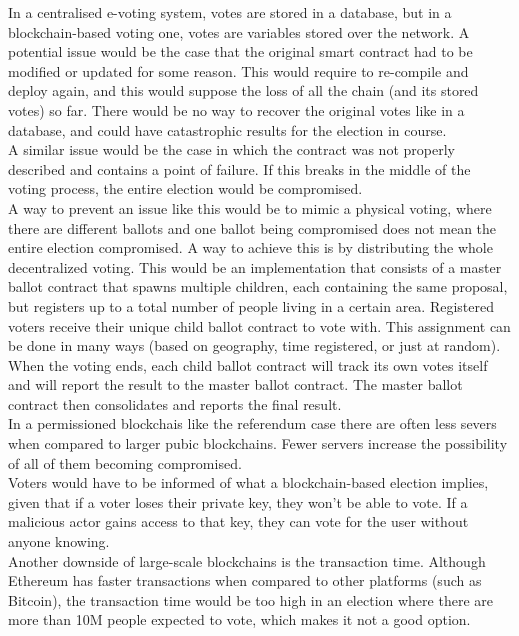 \documentclass[10pt]{article}
\begin{document}
\begin{multicols}{2}
In a centralised e-voting system, votes are stored in a database, but in a blockchain-based voting one, votes are variables stored over the network. A potential issue would be the case that the original smart contract had to be modified or updated for some reason. This would require to re-compile and deploy again, and this would suppose the loss of all the chain (and its stored votes) so far. There would be no way to recover the original votes like in a database, and could have catastrophic results for the election in course.\\

A similar issue would be the case in which the contract was not properly described and contains a point of failure. If this breaks in the middle of the voting process, the entire election would be compromised.\\

A way to prevent an issue like this would be to mimic a physical voting, where there are different ballots and one ballot being compromised does not mean the entire election compromised. A way to achieve this is by distributing the whole decentralized voting. This would be an implementation that consists of a master ballot contract that spawns multiple children, each containing the same proposal, but registers up to a total number of people living in a certain area. Registered voters receive their unique child ballot contract to vote with. This assignment can be done in many ways (based on geography, time registered, or just at random). When the voting ends, each child ballot contract will track its own votes itself and will report the result to the master ballot contract. The master ballot contract then consolidates and reports the final result.\\

In a permissioned blockchais like the referendum case there are often less severs when compared to larger pubic blockchains. Fewer servers increase the possibility of all of them becoming compromised.\\

Voters would have to be informed of what a blockchain-based election implies, given that if a voter loses their private key, they won’t be able to vote. If a malicious actor gains access to that key, they can vote for the user without anyone knowing.\\

Another downside of large-scale blockchains is the transaction time. Although Ethereum has faster transactions when compared to other platforms (such as Bitcoin), the transaction time would be too high in an election where there are more than 10M people expected to vote, which makes it not a good option.\\


\end{multicols}
\end{document}
